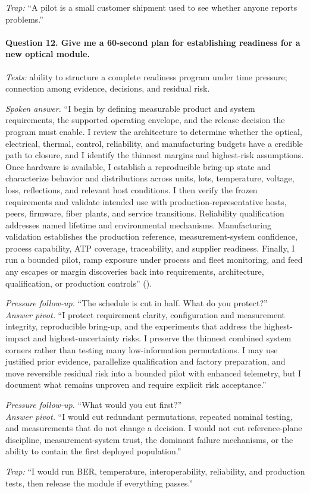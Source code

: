 \textit{Trap:} ``A pilot is a small customer shipment used to see whether anyone
reports problems.''

\paragraph{Question 12. Give me a 60-second plan for establishing readiness for
a new optical module.}
\textit{Tests:} ability to structure a complete readiness program under time
pressure; connection among evidence, decisions, and residual risk.

\textit{Spoken answer.}
``I begin by defining measurable product and system requirements, the supported
operating envelope, and the release decision the program must enable. I review
the architecture to determine whether the optical, electrical, thermal,
control, reliability, and manufacturing budgets have a credible path to
closure, and I identify the thinnest margins and highest-risk assumptions.
Once hardware is available, I establish a reproducible bring-up state and
characterize behavior and distributions across units, lots, temperature,
voltage, loss, reflections, and relevant host conditions. I then verify the
frozen requirements and validate intended use with production-representative
hosts, peers, firmware, fiber plants, and service transitions. Reliability
qualification addresses named lifetime and environmental mechanisms.
Manufacturing validation establishes the production reference,
measurement-system confidence, process capability, ATP coverage, traceability,
and supplier readiness. Finally, I run a bounded pilot, ramp exposure under
process and fleet monitoring, and feed any escapes or margin discoveries back
into requirements, architecture, qualification, or production controls''
().

\textit{Pressure follow-up.} ``The schedule is cut in half. What do you
protect?''\\
\textit{Answer pivot.} ``I protect requirement clarity, configuration and
measurement integrity, reproducible bring-up, and the experiments that address
the highest-impact and highest-uncertainty risks. I preserve the thinnest
combined system corners rather than testing many low-information permutations.
I may use justified prior evidence, parallelize qualification and factory
preparation, and move reversible residual risk into a bounded pilot with
enhanced telemetry, but I document what remains unproven and require explicit
risk acceptance.''

\textit{Pressure follow-up.} ``What would you cut first?''\\
\textit{Answer pivot.} ``I would cut redundant permutations, repeated nominal
testing, and measurements that do not change a decision. I would not cut
reference-plane discipline, measurement-system trust, the dominant failure
mechanisms, or the ability to contain the first deployed population.''

\textit{Trap:} ``I would run BER, temperature, interoperability, reliability,
and production tests, then release the module if everything passes.''


